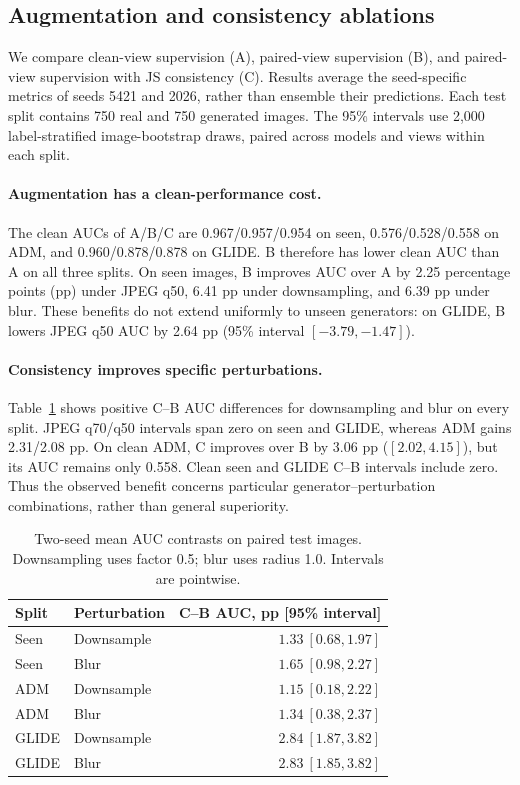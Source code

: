 
\subsection{Augmentation and consistency ablations}
\label{sec:wang-ablation-results}
We compare clean-view supervision (A), paired-view supervision (B), and
paired-view supervision with JS consistency (C). Results average the
seed-specific metrics of seeds 5421 and 2026, rather than ensemble their
predictions. Each test split contains 750 real and 750 generated images.
The 95\% intervals use 2,000 label-stratified image-bootstrap draws,
paired across models and views within each split.

\paragraph{Augmentation has a clean-performance cost.}
The clean AUCs of A/B/C are 0.967/0.957/0.954 on seen,
0.576/0.528/0.558 on ADM, and 0.960/0.878/0.878 on GLIDE.
B therefore has lower clean AUC than A on all three splits.
On seen images, B improves AUC over A by 2.25 percentage points (pp)
under JPEG q50, 6.41 pp under downsampling, and 6.39 pp under blur.
These benefits do not extend uniformly to unseen generators:
on GLIDE, B lowers JPEG q50 AUC by 2.64 pp (95\% interval
$[-3.79,-1.47]$).

\paragraph{Consistency improves specific perturbations.}
Table~\ref{tab:wang-consistency} shows positive C--B AUC differences
for downsampling and blur on every split. JPEG q70/q50 intervals span
zero on seen and GLIDE, whereas ADM gains 2.31/2.08 pp.
On clean ADM, C improves over B by 3.06 pp ($[2.02,4.15]$),
but its AUC remains only 0.558. Clean seen and GLIDE C--B intervals
include zero. Thus the observed benefit concerns particular
generator--perturbation combinations, rather than general superiority.

\begin{table}[t]
\centering
\small
\begin{tabular}{llr}
\hline
Split & Perturbation & C--B AUC, pp [95\% interval] \\
\hline
Seen & Downsample & $1.33\ [0.68,1.97]$ \\
Seen & Blur & $1.65\ [0.98,2.27]$ \\
ADM & Downsample & $1.15\ [0.18,2.22]$ \\
ADM & Blur & $1.34\ [0.38,2.37]$ \\
GLIDE & Downsample & $2.84\ [1.87,3.82]$ \\
GLIDE & Blur & $2.83\ [1.85,3.82]$ \\
\hline
\end{tabular}
\caption{Two-seed mean AUC contrasts on paired test images. Downsampling
uses factor 0.5; blur uses radius 1.0. Intervals are pointwise.}
\label{tab:wang-consistency}
\end{table}

